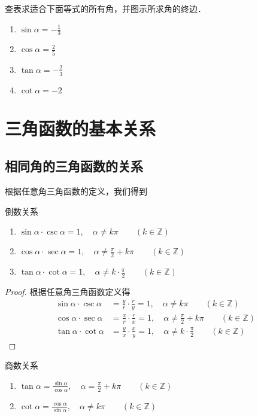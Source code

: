 \begin{ex}
    查表求适合下面等式的所有角，并图示所求角的终边．
    \begin{multicols}{2}
\begin{enumerate}
    \item $\sin\alpha =-\frac{1}{3}$
    \item $\cos\alpha =\frac{2}{5}$
    \item $\tan\alpha =-\frac{2}{3}$
    \item $\cot\alpha=-2$
\end{enumerate} 
    \end{multicols}
\end{ex}

\section{三角函数的基本关系}
\subsection{相同角的三角函数的关系}
根据任意角三角函数的定义，我们得到

\begin{blk}{倒数关系}
\begin{enumerate}
    \item $\sin\alpha\cdot \csc\alpha=1,\quad \alpha\ne k\pi\qquad (k\in\mathbb{Z})$
    \item $\cos\alpha\cdot \sec\alpha=1,\quad \alpha\ne \frac{\pi}{2}+k\pi\qquad (k\in\mathbb{Z})$
    \item $\tan\alpha\cdot \cot \alpha=1,\quad \alpha\ne k\cdot \frac{\pi}{2}\qquad (k\in\mathbb{Z})$
\end{enumerate}
\end{blk}

\begin{proof}
    根据任意角三角函数定义得
\[\begin{split}
    \sin\alpha\cdot \csc\alpha&=\frac{y}{r}\cdot\frac{r}{y}=1,\quad \alpha\ne k\pi\qquad (k\in\mathbb{Z})\\
    \cos\alpha\cdot \sec\alpha&=\frac{x}{r}\cdot \frac{r}{x}=1,\quad \alpha\ne \frac{\pi}{2}+k\pi\qquad (k\in\mathbb{Z})\\
    \tan\alpha\cdot \cot \alpha&=\frac{y}{x}\cdot \frac{x}{y}=1,\quad \alpha\ne k\cdot \frac{\pi}{2}\qquad (k\in\mathbb{Z})
\end{split}\]
\end{proof}

\begin{blk}{商数关系}
\begin{enumerate}
    \item $\tan\alpha=\frac{\sin\alpha}{\cos\alpha},\quad \alpha=\frac{\pi}{2}+k\pi\qquad (k\in\mathbb{Z})$
    \item $\cot\alpha=\frac{\cos\alpha}{\sin\alpha},\quad \alpha\ne k\pi\qquad (k\in\mathbb{Z})$
\end{enumerate}
\end{blk}

